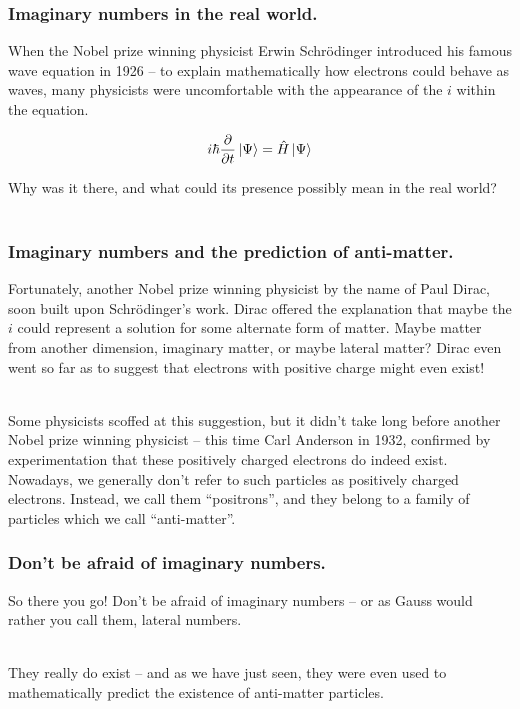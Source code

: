 %
%

\begin{frame}
\frametitle{Imaginary numbers in the real world.}

When the Nobel prize winning physicist Erwin Schr\"odinger introduced his famous wave equation in 1926 -- to explain mathematically how electrons
could behave as waves, many physicists were uncomfortable with the appearance of the \(i\) within the equation.

\begin{equation}
  i\hbar\dfrac{\partial}{\partial t}\ket{\Psi} = \hat{H}\ket{\Psi}
\end{equation}

 Why was it there, and what could its presence possibly mean in the real world?\\~\

\end{frame}


%
%

\begin{frame}
\frametitle{Imaginary numbers and the prediction of anti-matter.}

Fortunately, another Nobel prize winning physicist by the name of Paul Dirac, soon built upon Schr\"odinger's work. Dirac offered the explanation that maybe the
\(i\) could represent a solution for some alternate form of matter. Maybe matter from another dimension, imaginary matter, or maybe 
lateral matter? Dirac even went so far as to suggest that electrons with positive charge might even exist!\\~\

Some physicists scoffed at this suggestion, but it didn't take long before another Nobel prize winning physicist -- this time Carl Anderson in 1932, confirmed
by experimentation that these positively charged electrons do indeed exist. Nowadays, we generally don't refer to such particles as positively charged electrons.
Instead, we call them ``positrons'', and they belong to a family of particles which we call ``anti-matter''.

\end{frame}


%
%

\begin{frame}
\frametitle{Don't be afraid of imaginary numbers.}

So there you go! Don't be afraid of imaginary numbers -- or as Gauss would rather you call them, lateral numbers.\\~\

They really do exist -- and as we have just seen, they were even used to mathematically predict the existence of anti-matter particles.\\~\

\end{frame}


